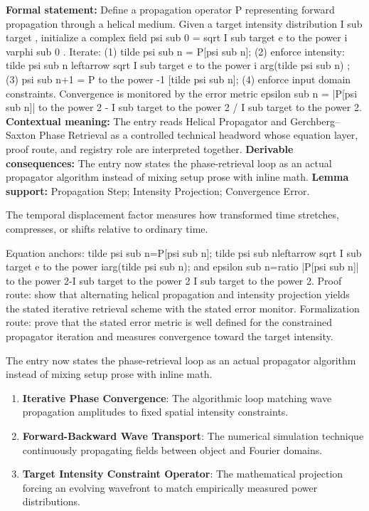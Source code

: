 \begingroup\footnotesize\setlength{\emergencystretch}{3em}\sloppy
\textbf{Formal statement:} Define a propagation operator P representing forward propagation through a helical medium. Given a target intensity distribution I sub target , initialize a complex field psi sub 0 = sqrt I sub target e to the power i varphi sub 0 . Iterate: (1) tilde psi sub n = P[psi sub n]; (2) enforce intensity: tilde psi sub n leftarrow sqrt I sub target e to the power i arg(tilde psi sub n) ; (3) psi sub n+1 = P to the power -1 [tilde psi sub n]; (4) enforce input domain constraints. Convergence is monitored by the error metric epsilon sub n = |P[psi sub n]| to the power 2 - I sub target to the power 2 / I sub target to the power 2. \textbf{Contextual meaning:} The entry reads Helical Propagator and Gerchberg--Saxton Phase Retrieval as a controlled technical headword whose equation layer, proof route, and registry role are interpreted together. \textbf{Derivable consequences:} The entry now states the phase-retrieval loop as an actual propagator algorithm instead of mixing setup prose with inline math. \textbf{Lemma support:} Propagation Step; Intensity Projection; Convergence Error.\par
\endgroup

The temporal displacement factor measures how transformed time stretches, compresses, or shifts relative to ordinary time.

Equation anchors: tilde psi sub n=P[psi sub n]; tilde psi sub nleftarrow sqrt I sub target e to the power iarg(tilde psi sub n); and epsilon sub n=ratio |P[psi sub n]| to the power 2-I sub target to the power 2 I sub target to the power 2. Proof route: show that alternating helical propagation and intensity projection yields the stated iterative retrieval scheme with the stated error monitor. Formalization route: prove that the stated error metric is well defined for the constrained propagator iteration and measures convergence toward the target intensity.

The entry now states the phase-retrieval loop as an actual propagator algorithm instead of mixing setup prose with inline math.
\endgroup

\begin{enumerate}[leftmargin=1.6em,itemsep=6pt,topsep=4pt]
\item \textbf{Iterative Phase Convergence}: The algorithmic loop matching wave propagation amplitudes to fixed spatial intensity constraints.
\item \textbf{Forward-Backward Wave Transport}: The numerical simulation technique continuously propagating fields between object and Fourier domains.
\item \textbf{Target Intensity Constraint Operator}: The mathematical projection forcing an evolving wavefront to match empirically measured power distributions.
\end{enumerate}

